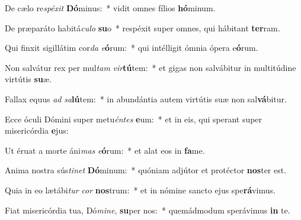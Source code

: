 \item De cælo re\textit{spé}\textit{xit} \textbf{Dó}minus:~* vidit omnes fílios \textbf{hó}minum.
\item De præparáto habitá\textit{cu}\textit{lo} \textbf{su}o~* respéxit super omnes, qui hábitant \textbf{ter}ram.
\item Qui finxit sigillátim cor\textit{da} \textit{e}\textbf{ó}rum:~* qui intélligit ómnia ópera e\textbf{ó}rum.
\item Non salvátur rex per mul\textit{tam} \textit{vir}\textbf{tú}tem:~* et gigas non salvábitur in multitúdine virtútis \textbf{su}æ.
\item Fallax equus \textit{ad} \textit{sa}\textbf{lú}tem:~* in abundántia autem virtútis suæ non sal\textbf{vá}bitur.
\item Ecce óculi Dómini super metu\textit{én}\textit{tes} \textbf{e}um:~* et in eis, qui sperant super misericórdia \textbf{e}jus:
\item Ut éruat a morte áni\textit{mas} \textit{e}\textbf{ó}rum:~* et alat eos in \textbf{fa}me.
\item Anima nostra sús\textit{ti}\textit{net} \textbf{Dó}minum:~* quóniam adjútor et protéctor \textbf{nos}ter est.
\item Quia in eo lætábi\textit{tur} \textit{cor} \textbf{nos}trum:~* et in nómine sancto ejus spe\textbf{rá}vimus.
\item Fiat misericórdia tua, Dó\textit{mi}\textit{ne}, \textbf{su}per nos:~* quemádmodum sperávimus \textbf{in} te.
